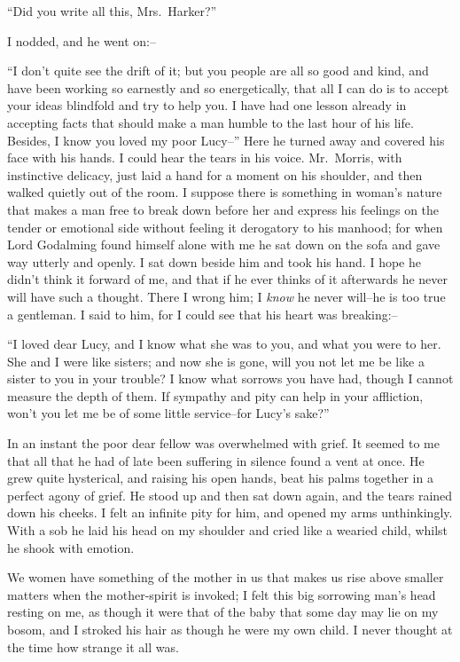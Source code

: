 \documentclass[12pt,openright]{book}
\begin{document}
“Did you write all this, Mrs. Harker?”

I nodded, and he went on:–

“I don’t quite see the drift of it; but you people are all so good and kind, and have been working so earnestly and so energetically, that all I can do is to accept your ideas blindfold and try to help you. I have had one lesson already in accepting facts that should make a man humble to the last hour of his life. Besides, I know you loved my poor Lucy–” Here he turned away and covered his face with his hands. I could hear the tears in his voice. Mr. Morris, with instinctive delicacy, just laid a hand for a moment on his shoulder, and then walked quietly out of the room. I suppose there is something in woman’s nature that makes a man free to break down before her and express his feelings on the tender or emotional side without feeling it derogatory to his manhood; for when Lord Godalming found himself alone with me he sat down on the sofa and gave way utterly and openly. I sat down beside him and took his hand. I hope he didn’t think it forward of me, and that if he ever thinks of it afterwards he never will have such a thought. There I wrong him; I \textit{know} he never will–he is too true a gentleman. I said to him, for I could see that his heart was breaking:–

“I loved dear Lucy, and I know what she was to you, and what you were to her. She and I were like sisters; and now she is gone, will you not let me be like a sister to you in your trouble? I know what sorrows you have had, though I cannot measure the depth of them. If sympathy and pity can help in your affliction, won’t you let me be of some little service–for Lucy’s sake?”

In an instant the poor dear fellow was overwhelmed with grief. It seemed to me that all that he had of late been suffering in silence found a vent at once. He grew quite hysterical, and raising his open hands, beat his palms together in a perfect agony of grief. He stood up and then sat down again, and the tears rained down his cheeks. I felt an infinite pity for him, and opened my arms unthinkingly. With a sob he laid his head on my shoulder and cried like a wearied child, whilst he shook with emotion.

We women have something of the mother in us that makes us rise above smaller matters when the mother-spirit is invoked; I felt this big sorrowing man’s head resting on me, as though it were that of the baby that some day may lie on my bosom, and I stroked his hair as though he were my own child. I never thought at the time how strange it all was.
\end{document}
